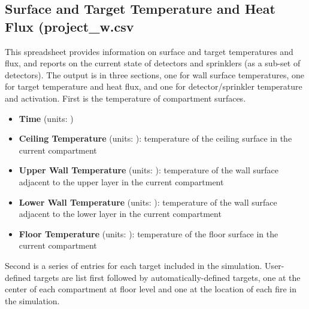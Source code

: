 \subsection{Surface and Target Temperature and Heat Flux (project\_w.csv}

This spreadsheet provides information on surface and target temperatures and flux, and reports on the current state of detectors and sprinklers (as a sub-set of detectors). The output is in three sections, one for wall surface temperatures, one for target temperature and heat flux, and one for detector/sprinkler temperature and activation. First is the temperature of compartment surfaces.

\begin{itemize}
\item \textbf{Time} (units: \degc)
\item \textbf{Ceiling Temperature} (units: \degc): temperature of the ceiling surface in the current compartment
\item \textbf{Upper Wall Temperature} (units: \degc): temperature of the wall surface adjacent to the upper layer in the current compartment
\item \textbf{Lower Wall Temperature} (units: \degc): temperature of the  wall surface adjacent to the lower layer in the current compartment
\item \textbf{Floor Temperature} (units: \degc): temperature of the floor surface in the current compartment
\end{itemize}

Second is a series of entries for each target included in the simulation.  User-defined targets are list first followed by automatically-defined targets, one at the center of each compartment at floor level and one at the location of each fire in the simulation.

